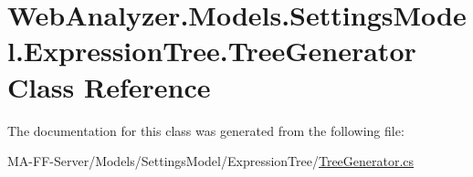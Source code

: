 \hypertarget{class_web_analyzer_1_1_models_1_1_settings_model_1_1_expression_tree_1_1_tree_generator}{}\section{Web\+Analyzer.\+Models.\+Settings\+Model.\+Expression\+Tree.\+Tree\+Generator Class Reference}
\label{class_web_analyzer_1_1_models_1_1_settings_model_1_1_expression_tree_1_1_tree_generator}


The documentation for this class was generated from the following file\+:\begin{DoxyCompactItemize}
\item 
M\+A-\/\+F\+F-\/\+Server/\+Models/\+Settings\+Model/\+Expression\+Tree/\hyperlink{_tree_generator_8cs}{Tree\+Generator.\+cs}\end{DoxyCompactItemize}

